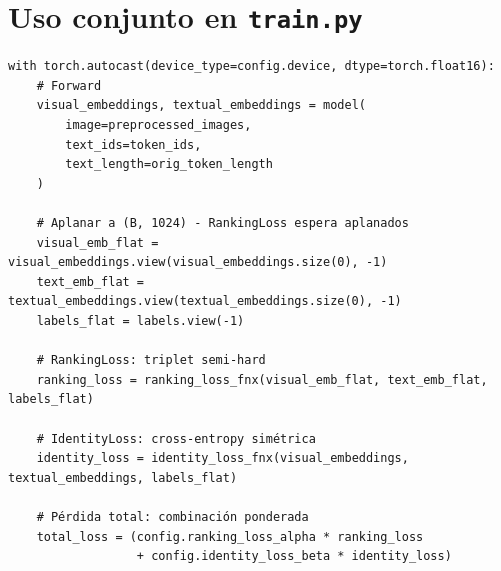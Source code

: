 \section{Uso conjunto en \texttt{train.py}}

\begin{verbatim}
with torch.autocast(device_type=config.device, dtype=torch.float16):
    # Forward
    visual_embeddings, textual_embeddings = model(
        image=preprocessed_images,
        text_ids=token_ids,
        text_length=orig_token_length
    )

    # Aplanar a (B, 1024) - RankingLoss espera aplanados
    visual_emb_flat = visual_embeddings.view(visual_embeddings.size(0), -1)
    text_emb_flat = textual_embeddings.view(textual_embeddings.size(0), -1)
    labels_flat = labels.view(-1)

    # RankingLoss: triplet semi-hard
    ranking_loss = ranking_loss_fnx(visual_emb_flat, text_emb_flat, labels_flat)

    # IdentityLoss: cross-entropy simétrica
    identity_loss = identity_loss_fnx(visual_embeddings, textual_embeddings, labels_flat)

    # Pérdida total: combinación ponderada
    total_loss = (config.ranking_loss_alpha * ranking_loss
                  + config.identity_loss_beta * identity_loss)
\end{verbatim}
